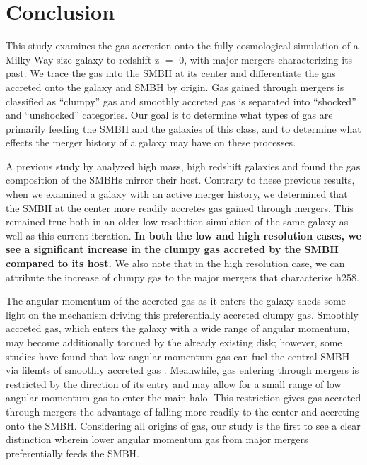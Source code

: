 \documentclass[]{emulateapj}
\begin{document}



\section{Conclusion}
This study examines the gas accretion onto the fully cosmological simulation of a Milky Way-size galaxy to redshift z $=$ 0, with major mergers characterizing its past. We trace the gas into the SMBH at its center and differentiate the gas accreted onto the galaxy and SMBH by origin. Gas gained through mergers is classified as ``clumpy'' gas and smoothly accreted gas is separated into ``shocked'' and ``unshocked'' categories. Our goal is to determine what types of gas are primarily feeding the SMBH and the galaxies of this class, and to determine what effects the merger history of a galaxy may have on these processes.

A previous study by \cite{Bellovary2013} analyzed high mass, high redshift galaxies and found the gas composition of the SMBHs mirror their host. Contrary to these previous results, when we examined a galaxy with an active merger history, we determined that the SMBH at the center more readily accretes gas gained through mergers. This remained true both in an older low resolution simulation of the same galaxy as well as this current iteration. \textbf{In both the low and high resolution cases, we see a significant increase in the clumpy gas accreted by the SMBH compared to its host.} We also note that in the high resolution case, we can attribute the increase of clumpy gas to the major mergers that characterize h258. 

The angular momentum of the accreted gas as it enters the galaxy sheds some light on the mechanism driving this preferentially accreted clumpy gas. Smoothly accreted gas, which enters the galaxy with a wide range of angular momentum, may become additionally torqued by the already existing disk; however, some studies have found that low angular momentum gas can fuel the central SMBH via filemts of smoothly accreted gas \citep{Dubois2012,DiMatteo2016}. Meanwhile, gas entering through mergers is restricted by the direction of its entry and may allow for a small range of low angular momentum gas to enter the main halo. This restriction gives gas accreted through mergers the advantage of falling more readily to the center and accreting onto the SMBH. Considering all origins of gas, our study is the first to see a clear distinction wherein lower angular momentum gas from major mergers preferentially feeds the SMBH.
\end{document}
